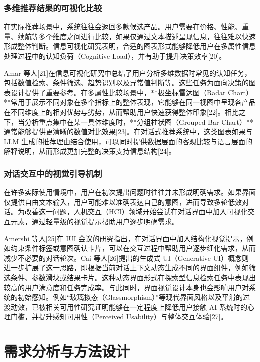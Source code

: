 \documentclass{nkuthesis}
\begin{document}
\subsubsection{多维推荐结果的可视化比较}

在实际推荐场景中，系统往往会返回多款候选产品。用户需要在价格、性能、重量、续航等多个维度之间进行比较，如果仅通过文本描述呈现信息，往往难以快速形成整体判断。信息可视化研究表明，合适的图表形式能够降低用户在多属性信息处理过程中的认知负荷（Cognitive Load），并有助于提升决策效率[20]。

Amar 等人[21]在信息可视化研究中总结了用户分析多维数据时常见的认知任务，包括数值检索、条件筛选、趋势识别以及异常值判断等。这些任务为面向决策的图表设计提供了重要参考。在多属性比较场景中，**极坐标雷达图（Radar Chart）**常用于展示不同对象在多个指标上的整体表现，它能够在同一视图中呈现各产品在不同维度上的相对优势与劣势，从而帮助用户快速获得整体印象[22]。相比之下，当分析重点集中在某一具体维度时，**分组柱状图（Grouped Bar Chart）**通常能够提供更清晰的数值对比效果[23]。在对话式推荐系统中，这类图表如果与 LLM 生成的推荐理由结合使用，可以同时提供数据层面的客观比较与语言层面的解释说明，从而形成更加完整的决策支持信息结构[24]。


\subsubsection{对话交互中的视觉引导机制}

在许多实际使用情境中，用户在初次提出问题时往往并未形成明确需求。如果界面仅提供自由文本输入，用户可能难以准确表达自己的意图，进而导致多轮低效对话。为改善这一问题，人机交互（HCI）领域开始尝试在对话界面中加入可视化交互元素，通过轻量级的视觉提示帮助用户逐步明确需求。

Amershi 等人[25]在 IUI 会议的研究指出，在对话界面中加入结构化视觉提示，例如约束条件标签或意图确认卡片，可以在交互过程中帮助用户逐步细化需求，从而减少不必要的对话轮次。Cai 等人[26]提出的生成式 UI（Generative UI）概念则进一步扩展了这一思路，即根据当前对话上下文动态生成不同的界面组件，例如筛选条件、参数滑块或结果卡片。这种动态界面形式在探索型信息检索任务中表现出较高的用户满意度和任务完成率。与此同时，界面视觉设计本身也会影响用户对系统的初始感知。例如“玻璃拟态（Glassmorphism）”等现代界面风格以及平滑的过渡动效，已被相关可用性研究证明能够在一定程度上降低用户接触 AI 系统时的心理门槛，并提升感知可用性（Perceived Usability）与整体交互体验[27]。

\section{需求分析与方法设计}
\end{document}
